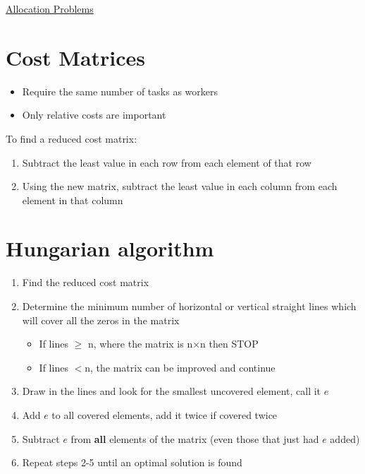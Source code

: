 \documentclass{article}[18pt]
\begin{document}
\begin{center}
\underline{\huge Allocation Problems}
\end{center}
\section{Cost Matrices}
\begin{itemize}
\item Require the same number of tasks as workers
\item Only relative costs are important
\end{itemize}
To find a reduced cost matrix:
\begin{enumerate}
\item Subtract the least value in each row from each element of that row
\item Using the new matrix, subtract the least value in each column from each element in that column
\end{enumerate}
\section{Hungarian algorithm}
\begin{enumerate}
\item Find the reduced cost matrix
\item Determine the minimum number of horizontal or vertical straight lines which will cover all the zeros in the matrix
\begin{itemize}
\item If lines $\geqslant$ n, where the matrix is n$\times$n then STOP
\item If lines $<$n, the matrix can be improved and continue 
\end{itemize}
\item Draw in the lines and look for the smallest uncovered element, call it $e$
\item Add $e$ to all covered elements, add it twice if covered twice
\item Subtract $e$ from \textbf{all} elements of the matrix (even those that just had $e$ added)
\item Repeat steps 2-5 until an optimal solution is found
\end{enumerate}
\end{document}
